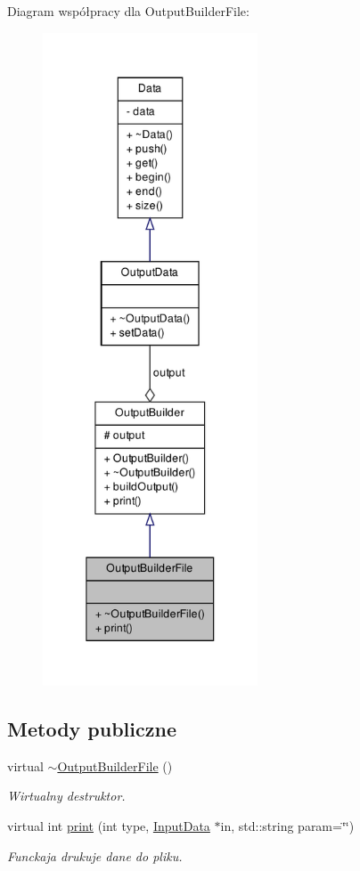 \-Diagram współpracy dla \-Output\-Builder\-File\-:\nopagebreak
\begin{figure}[H]
\begin{center}
\leavevmode
\includegraphics[height=550pt]{class_output_builder_file__coll__graph}
\end{center}
\end{figure}
\subsection*{\-Metody publiczne}
\begin{DoxyCompactItemize}
\item 
virtual \hyperlink{class_output_builder_file_a03614b5dfccb89c6b9b19969eca9d261}{$\sim$\-Output\-Builder\-File} ()
\begin{DoxyCompactList}\small\item\em \-Wirtualny destruktor. \end{DoxyCompactList}\item 
virtual int \hyperlink{class_output_builder_file_a0906f1b222f169060fbdbb3d1026b897}{print} (int type, \hyperlink{class_input_data}{\-Input\-Data} $\ast$in, std\-::string param=\char`\"{}\char`\"{})
\begin{DoxyCompactList}\small\item\em \-Funckaja drukuje dane do pliku. \end{DoxyCompactList}\end{DoxyCompactItemize}


